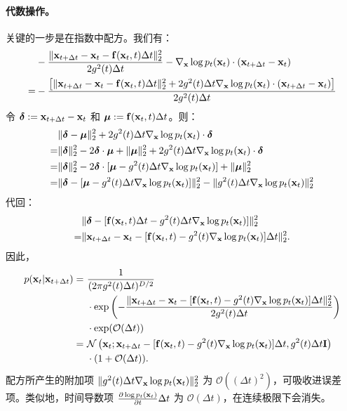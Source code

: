 \paragraph{代数操作。}
关键的一步是在指数中配方。我们有：
\begin{align*}
    &-\frac{\|{\mathbf{x}}_{t+\Delta t} - {\mathbf{x}}_t - {\mathbf{f}}({\mathbf{x}}_t, t) \Delta t\|_2^2}{2 g^2(t) \Delta t} - \nabla_{{\mathbf{x}}} \log p_t({\mathbf{x}}_t) \cdot ({\mathbf{x}}_{t+\Delta t} - {\mathbf{x}}_t) \nonumber \\
    = &-\frac{\left[\|{\mathbf{x}}_{t+\Delta t} - {\mathbf{x}}_t - {\mathbf{f}}({\mathbf{x}}_t, t) \Delta t\|_2^2 + 2 g^2(t) \Delta t \nabla_{{\mathbf{x}}} \log p_t({\mathbf{x}}_t) \cdot ({\mathbf{x}}_{t+\Delta t} - {\mathbf{x}}_t)\right]}{2 g^2(t) \Delta t} 
\end{align*}
令 $\boldsymbol{\delta} := {\mathbf{x}}_{t+\Delta t} - {\mathbf{x}}_t$ 和 $\boldsymbol{\mu} := {\mathbf{f}}({\mathbf{x}}_t, t) \Delta t$。则：
\begin{align*}
    &\|\boldsymbol{\delta} - \boldsymbol{\mu}\|_2^2 + 2 g^2(t) \Delta t \nabla_{{\mathbf{x}}} \log p_t({\mathbf{x}}_t) \cdot \boldsymbol{\delta} \nonumber \\
    = &\|\boldsymbol{\delta}\|_2^2 - 2\boldsymbol{\delta} \cdot \boldsymbol{\mu} + \|\boldsymbol{\mu}\|_2^2 + 2 g^2(t) \Delta t \nabla_{{\mathbf{x}}} \log p_t({\mathbf{x}}_t) \cdot \boldsymbol{\delta} \nonumber \\
    = &\|\boldsymbol{\delta}\|_2^2 - 2\boldsymbol{\delta} \cdot [\boldsymbol{\mu} - g^2(t) \Delta t \nabla_{{\mathbf{x}}} \log p_t({\mathbf{x}}_t)] + \|\boldsymbol{\mu}\|_2^2 \nonumber \\
    = &\|\boldsymbol{\delta} - [\boldsymbol{\mu} - g^2(t) \Delta t \nabla_{{\mathbf{x}}} \log p_t({\mathbf{x}}_t)]\|_2^2 - \|g^2(t) \Delta t \nabla_{{\mathbf{x}}} \log p_t({\mathbf{x}}_t)\|_2^2 
\end{align*}
代回：
\begin{align*}
    &\|\boldsymbol{\delta} - [{\mathbf{f}}({\mathbf{x}}_t, t) \Delta t - g^2(t) \Delta t \nabla_{{\mathbf{x}}} \log p_t({\mathbf{x}}_t)]\|_2^2 \nonumber \\
    = &\|{\mathbf{x}}_{t+\Delta t} - {\mathbf{x}}_t - [{\mathbf{f}}({\mathbf{x}}_t, t) - g^2(t) \nabla_{{\mathbf{x}}} \log p_t({\mathbf{x}}_t)] \Delta t\|_2^2. 
\end{align*}
因此，
\begin{align*}
    p({\mathbf{x}}_t | {\mathbf{x}}_{t+\Delta t}) 
    =~&\frac{1}{(2\pi g^2(t) \Delta t)^{D/2}} \nonumber \\
    \quad &\cdot \exp\left(-\frac{\|{\mathbf{x}}_{t+\Delta t} - {\mathbf{x}}_t - [{\mathbf{f}}({\mathbf{x}}_t, t) - g^2(t) \nabla_{{\mathbf{x}}} \log p_t({\mathbf{x}}_t)] \Delta t\|_2^2}{2 g^2(t) \Delta t}\right) \nonumber \\
    \quad &\cdot \exp(\mathcal{O}(\Delta t)) \nonumber \\
    =~&\mathcal{N}\left({\mathbf{x}}_t; {\mathbf{x}}_{t+\Delta t} - [{\mathbf{f}}({\mathbf{x}}_t, t) - g^2(t) \nabla_{{\mathbf{x}}} \log p_t({\mathbf{x}}_t)] \Delta t, g^2(t) \Delta t \mathbf{I}\right) \nonumber \\
    \quad &\cdot (1 + \mathcal{O}(\Delta t)).
\end{align*}
配方所产生的附加项 $\|g^2(t) \Delta t \nabla_{{\mathbf{x}}} \log p_t({\mathbf{x}}_t)\|_2^2$ 为 $\mathcal{O}((\Delta t)^2)$，可吸收进误差项。类似地，时间导数项 $\frac{\partial \log p_t({\mathbf{x}}_t)}{\partial t} \Delta t$ 为 $\mathcal{O}(\Delta t)$，在连续极限下会消失。

